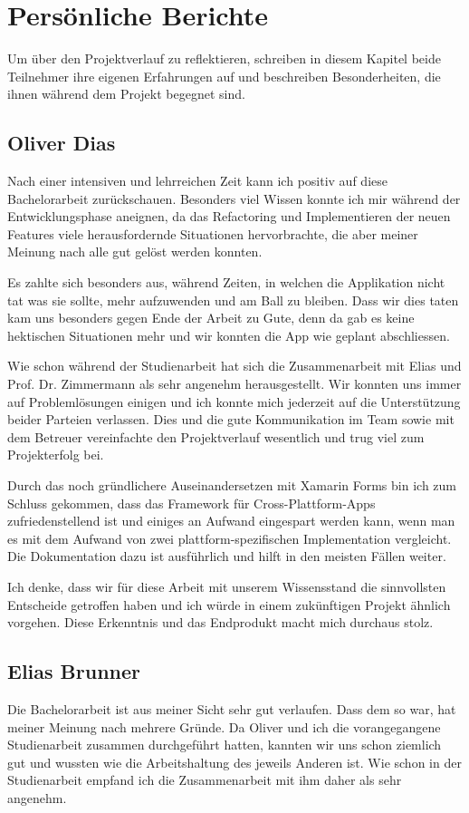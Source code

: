 \section{Persönliche Berichte}
Um über den Projektverlauf zu reflektieren, schreiben in diesem Kapitel beide Teilnehmer ihre eigenen Erfahrungen auf und beschreiben Besonderheiten, die ihnen während dem Projekt begegnet sind. 

\subsection{Oliver Dias}

Nach einer intensiven und lehrreichen Zeit kann ich positiv auf diese Bachelorarbeit zurückschauen. Besonders viel Wissen konnte ich mir während der Entwicklungsphase aneignen, da das Refactoring und Implementieren der neuen Features viele herausfordernde Situationen hervorbrachte, die aber meiner Meinung nach alle gut gelöst werden konnten.  

Es zahlte sich besonders aus, während Zeiten, in welchen die Applikation nicht tat was sie sollte, mehr aufzuwenden und am Ball zu bleiben. Dass wir dies taten kam uns besonders gegen Ende der Arbeit zu Gute, denn da gab es keine hektischen Situationen mehr und wir konnten die App wie geplant abschliessen.

Wie schon während der Studienarbeit hat sich die Zusammenarbeit mit Elias und Prof. Dr. Zimmermann als sehr angenehm herausgestellt. Wir konnten uns immer auf Problemlösungen einigen und ich konnte mich jederzeit auf die Unterstützung beider Parteien verlassen. Dies und die gute Kommunikation im Team sowie mit dem Betreuer vereinfachte den Projektverlauf wesentlich und trug viel zum Projekterfolg bei. 

Durch das noch gründlichere Auseinandersetzen mit Xamarin Forms bin ich zum Schluss gekommen, dass das Framework für Cross-Plattform-Apps zufriedenstellend ist und einiges an Aufwand eingespart werden kann, wenn man es mit dem Aufwand von zwei plattform-spezifischen Implementation vergleicht. Die Dokumentation dazu ist ausführlich und hilft in den meisten Fällen weiter. 

Ich denke, dass wir für diese Arbeit mit unserem Wissensstand die sinnvollsten Entscheide getroffen haben und ich würde in einem zukünftigen Projekt ähnlich vorgehen. Diese Erkenntnis und das Endprodukt macht mich durchaus stolz.

\subsection{Elias Brunner}
Die Bachelorarbeit ist aus meiner Sicht sehr gut verlaufen. Dass dem so war, hat meiner Meinung nach mehrere Gründe. Da Oliver und ich die vorangegangene Studienarbeit zusammen durchgeführt hatten, kannten wir uns schon ziemlich gut und wussten wie die Arbeitshaltung des jeweils Anderen ist. Wie schon in der Studienarbeit empfand ich die Zusammenarbeit mit ihm daher als sehr angenehm.

